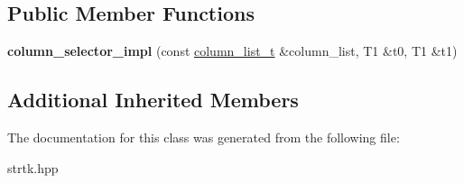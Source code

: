 \subsection*{Public Member Functions}
\begin{DoxyCompactItemize}
\item 
\hypertarget{classstrtk_1_1details_1_1column__selector__impl_3_01T0_00_01T1_01_4_a8cee252b929e109aa2a747751427be7e}{{\bfseries column\-\_\-selector\-\_\-impl} (const \hyperlink{structstrtk_1_1details_1_1column__list__impl}{column\-\_\-list\-\_\-t} \&column\-\_\-list, T1 \&t0, T1 \&t1)}\label{classstrtk_1_1details_1_1column__selector__impl_3_01T0_00_01T1_01_4_a8cee252b929e109aa2a747751427be7e}

\end{DoxyCompactItemize}
\subsection*{Additional Inherited Members}


The documentation for this class was generated from the following file\-:\begin{DoxyCompactItemize}
\item 
strtk.\-hpp\end{DoxyCompactItemize}
